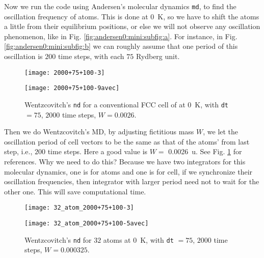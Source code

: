Now we run the code using Andersen's molecular dynamics \texttt{md}, to find the oscillation frequency of atoms. This is done at \SI{0}{\kelvin}, so we have to shift the atoms a little from their equilibrium
positions, or else we will not observe any oscillation phenomenon, like in Fig. \ref{fig:andersen0:mini:subfig:a}.
For instance, in Fig. \ref{fig:andersen0:mini:subfig:b} we can roughly assume that
one period of this oscillation is $200$ time steps, with each $75$ Rydberg unit.

\begin{figure}[H]
	\centering
	\begin{minipage}[t]{.48\linewidth}
		\centering
		\texttt{[image: 2000+75+100-3]}
		\label{fig:adjust:a}
	\end{minipage}%
	\hfill
	\begin{minipage}[t]{.48\linewidth}
		\centering
		\texttt{[image: 2000+75+100-9avec]}
		\label{fig:adjust:b}
	\end{minipage}
	\caption{Wentzcovitch's \texttt{nd} for a conventional FCC cell of  at \SI{0}{\kelvin},
		with \texttt{dt} $= 75$, $2000$ time steps, $W = 0.0026$.}
	\label{fig:adjust}
\end{figure}

Then we do Wentzcovitch's MD, by adjusting fictitious mass $W$, we let the oscillation
period of cell vectors to be the same as that of the atoms' from last step, i.e., $200$ time
steps. Here a good value is $W = $ \SI{0.0026}{\atomicmassunit}. See Fig. \ref{fig:adjust} for references. Why we need to do this? Because we have two integrators for this molecular dynamics,
one is for atoms and one is for cell, if we synchronize their oscillation frequencies, then
integrator with larger period need not to wait for the other one. This will save computational
time.

\begin{figure}[H]
	\centering
	\begin{minipage}[t]{.48\linewidth}
		\centering
		\texttt{[image: 32\_atom\_2000+75+100-3]}
		\label{fig:32atom:a}
	\end{minipage}%
	\hfill
	\begin{minipage}[t]{.48\linewidth}
		\centering
		\texttt{[image: 32\_atom\_2000+75+100-5avec]}
		\label{fig:32atom:b}
	\end{minipage}
	\caption{Wentzcovitch's \texttt{nd} for $32$  atoms at \SI{0}{\kelvin},
		with \texttt{dt} $= 75$, $2000$ time steps, $W = 0.000325$.}
	\label{fig:32atom}
\end{figure}


